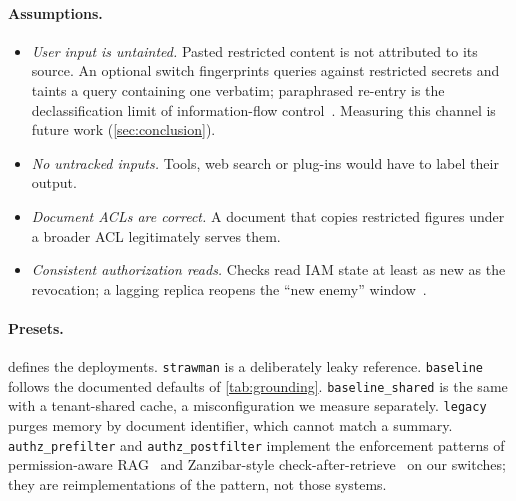 \paragraph{Assumptions.}
\begin{itemize}
\item[A1] \emph{User input is untainted.} Pasted restricted content is not attributed to its source.
An optional switch fingerprints queries against restricted secrets and taints a query containing one
verbatim; paraphrased re-entry is the declassification limit of information-flow
control~\cite{myers1997decentralized,sabelfeld2003language}. Measuring this channel is future work
(\cref{sec:conclusion}).
\item[A2] \emph{No untracked inputs.} Tools, web search or plug-ins would have to label their output.
\item[A3] \emph{Document ACLs are correct.} A document that copies restricted figures under a broader
ACL legitimately serves them.
\item[A4] \emph{Consistent authorization reads.} Checks read IAM state at least as new as the
revocation; a lagging replica reopens the ``new enemy'' window~\cite{pang2019zanzibar}.
\end{itemize}

\paragraph{Presets.}
 defines the deployments. \texttt{strawman} is a deliberately leaky reference.
\texttt{baseline} follows the documented defaults of \cref{tab:grounding}. \texttt{baseline\_shared}
is the same with a tenant-shared cache, a misconfiguration we measure separately. \texttt{legacy} purges
memory by document identifier, which cannot match a summary. \texttt{authz\_prefilter} and
\texttt{authz\_postfilter} implement the enforcement patterns of permission-aware
RAG~\cite{jeong2025permissionrag} and Zanzibar-style check-after-retrieve~\cite{pang2019zanzibar} on our
switches; they are reimplementations of the pattern, not those systems.

